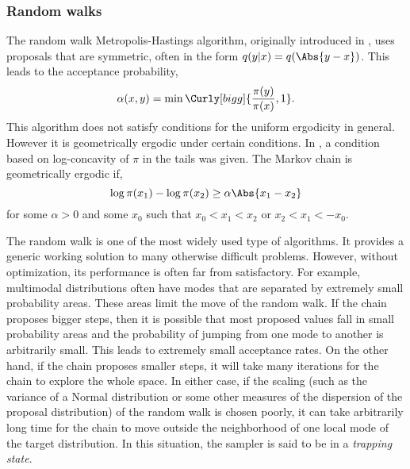 \subsubsection{Random walks}
\label{ssub:Random walks}

The random walk Metropolis-Hastings algorithm, originally introduced in
\cite{Metropolis:1953ex}, uses proposals that are symmetric, often in the form
$q(y|x) = q(\Abs{y - x})$. This leads to the acceptance probability,
\begin{equation}
  \alpha(x,y) = \min\Curly[bigg]{\frac{\pi(y)}{\pi(x)},1}.
\end{equation}
This algorithm does not satisfy conditions for the uniform ergodicity in
general. However it is geometrically ergodic under certain conditions. In
\cite{Mengersen:1996th}, a condition based on log-concavity of $\pi$ in the
tails was given. The Markov chain is geometrically ergodic if,
\begin{equation}
  \log\pi(x_1) - \log\pi(x_2) \ge \alpha\Abs{x_1 - x_2}
\end{equation}
for some $\alpha > 0$ and some $x_0$ such that $x_0 < x_1 < x_2$ or $x_2 < x_1
< -x_0$.

The random walk is one of the most widely used type of \mcmc algorithms. It
provides a generic working solution to many otherwise difficult problems.
However, without optimization, its performance is often far from
satisfactory. For example, multimodal distributions often have modes that are
separated by extremely small probability areas. These areas limit the move of
the random walk. If the chain proposes bigger steps, then it is possible that
most proposed values fall in small probability areas and the probability of
jumping from one mode to another is arbitrarily small. This leads to
extremely small acceptance rates. On the other hand, if the chain proposes
smaller steps, it will take many iterations for the chain to explore the
whole space. In either case, if the scaling (such as the variance of a Normal
distribution or some other measures of the dispersion of the proposal
distribution) of the random walk is chosen poorly, it can take arbitrarily
long time for the chain to move outside the neighborhood of one local mode of
the target distribution. In this situation, the sampler is said to be in a
\emph{trapping state}.

